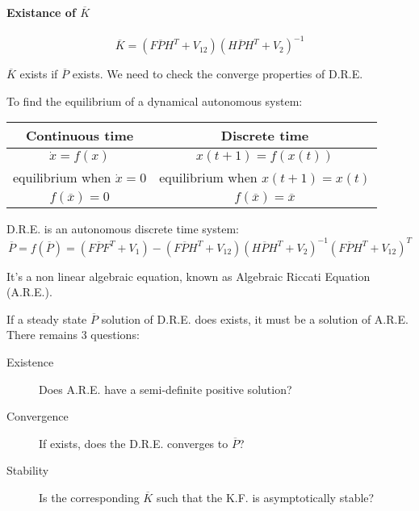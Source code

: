 \paragraph{Existance of $\overline{K}$}

\[
    \overline{K} = \left(F\overline{P}H^T + V_{12}\right)\left(H\overline{P}H^T+V_2\right)^{-1}
\]

$\overline{K}$ exists if $\overline{P}$ exists.
We need to check the converge properties of D.R.E.

To find the equilibrium of a dynamical autonomous system:

\begin{center}
    \begin{tabular}{c|c}
        \textbf{Continuous time} & \textbf{Discrete time} \\
        \hline
        $\dot{x} = f(x)$ & $x(t+1) = f(x(t))$ \\
        equilibrium when $\dot{x} = 0$ & equilibrium when $x(t+1) = x(t)$ \\
        $f(\overline{x}) = 0$ & $f(\overline{x}) = \overline{x}$ \\
    \end{tabular}
\end{center}

D.R.E. is an autonomous discrete time system:
\[
    \overline{P} = f(\overline{P}) = \left( F\overline{P}F^T + V_1 \right)-\left(F\overline{P}H^T + V_{12}\right)\left(H\overline{P}H^T + V_2\right)^{-1}\left(F\overline{P}H^T+V_{12}\right)^T
\]

It's a non linear algebraic equation, known as Algebraic Riccati Equation (A.R.E.).

If a steady state $\overline{P}$ solution of D.R.E. does exists, it must be a solution of A.R.E.
There remains 3 questions:
\begin{description}
    \item[Existence] Does A.R.E. have a semi-definite positive solution?
    \item[Convergence] If exists, does the D.R.E. converges to $\overline{P}$?
    \item[Stability] Is the corresponding $\overline{K}$ such that the K.F. is asymptotically stable?
\end{description}
